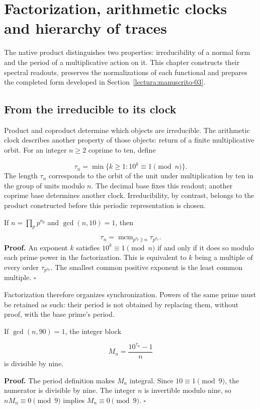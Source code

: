 \section{Factorization, arithmetic clocks and hierarchy of traces}
\label{lectura:manuscrito-02}
The native product distinguishes two properties: irreducibility of a normal form and the period of a multiplicative action on it. This chapter constructs their spectral readouts, preserves the normalizations of each functional and prepares the completed form developed in Section~\ref{lectura:manuscrito-03}.

\subsection{From the irreducible to its clock}
Product and coproduct determine which objects are irreducible. The arithmetic clock describes another property of those objects: return of a finite multiplicative orbit. For an integer $n\ge2$ coprime to ten, define

\[
\tau_n=\min\{k\ge1:10^k\equiv1\pmod n\}.
\]
The length $\tau_n$ corresponds to the orbit of the unit under multiplication by ten in the group of units modulo $n$. The decimal base fixes this readout; another coprime base determines another clock. Irreducibility, by contrast, belongs to the product constructed before this periodic representation is chosen.

If $n=\prod_p p^{a_p}$ and $\gcd(n,10)=1$, then

\[
\tau_n=\operatorname{mcm}_{p^{a_p}\parallel n}\tau_{p^{a_p}}.
\]
\textbf{Proof.} An exponent $k$ satisfies $10^k\equiv1\pmod n$ if and only if it does so modulo each prime power in the factorization. This is equivalent to $k$ being a multiple of every order $\tau_{p^{a_p}}$. The smallest common positive exponent is the least common multiple. \hfill\(\square\)

Factorization therefore organizes synchronization. Powers of the same prime must be retained as such: their period is not obtained by replacing them, without proof, with the base prime's period.

If $\gcd(n,90)=1$, the integer block

\[
M_n=\frac{10^{\tau_n}-1}{n}
\]
is divisible by nine.

\textbf{Proof.} The period definition makes $M_n$ integral. Since $10\equiv1\pmod9$, the numerator is divisible by nine. The integer $n$ is invertible modulo nine, so $nM_n\equiv0\pmod9$ implies $M_n\equiv0\pmod9$. \hfill\(\square\)

